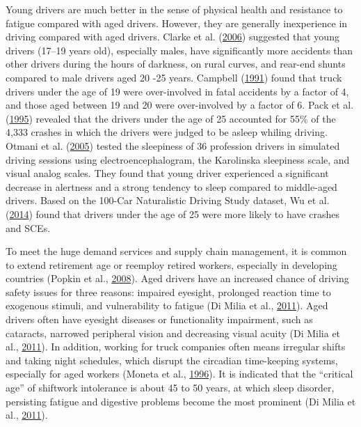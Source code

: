 \documentclass[12pt]{book}
\numberwithin{equation}{chapter}
\begin{document}
Young drivers are much better in the sense of physical health and resistance to fatigue compared with aged drivers. However, they are generally inexperience in driving compared with aged drivers. Clarke et al. (\protect\hyperlink{ref-clarke2006young}{2006}) suggested that young drivers (17--19 years old), especially males, have significantly more accidents than other drivers during the hours of darkness, on rural curves, and rear-end shunts compared to male drivers aged 20 -25 years. Campbell (\protect\hyperlink{ref-campbell1991fatal}{1991}) found that truck drivers under the age of 19 were over-involved in fatal accidents by a factor of 4, and those aged between 19 and 20 were over-involved by a factor of 6. Pack et al. (\protect\hyperlink{ref-pack1995characteristics}{1995}) revealed that the drivers under the age of 25 accounted for 55\% of the 4,333 crashes in which the drivers were judged to be asleep whiling driving. Otmani et al. (\protect\hyperlink{ref-otmani2005sleepiness}{2005}) tested the sleepiness of 36 profession drivers in simulated driving sessions using electroencephalogram, the Karolinska sleepiness scale, and visual analog scales. They found that young driver experienced a significant decrease in alertness and a strong tendency to sleep compared to middle-aged drivers. Based on the 100-Car Naturalistic Driving Study dataset, Wu et al. (\protect\hyperlink{ref-wu2014using}{2014}) found that drivers under the age of 25 were more likely to have crashes and SCEs.

To meet the huge demand services and supply chain management, it is common to extend retirement age or reemploy retired workers, especially in developing countries (Popkin et al., \protect\hyperlink{ref-popkin2008age}{2008}). Aged drivers have an increased chance of driving safety issues for three reasons: impaired eyesight, prolonged reaction time to exogenous stimuli, and vulnerability to fatigue (Di Milia et al., \protect\hyperlink{ref-di2011demographic}{2011}). Aged drivers often have eyesight diseases or functionality impairment, such as cataracts, narrowed peripheral vision and decreasing visual acuity (Di Milia et al., \protect\hyperlink{ref-di2011demographic}{2011}). In addition, working for truck companies often means irregular shifts and taking night schedules, which disrupt the circadian time-keeping systems, especially for aged workers (Moneta et al., \protect\hyperlink{ref-moneta1996time}{1996}). It is indicated that the ``critical age'' of shiftwork intolerance is about 45 to 50 years, at which sleep disorder, persisting fatigue and digestive problems become the most prominent (Di Milia et al., \protect\hyperlink{ref-di2011demographic}{2011}).
\end{document}
